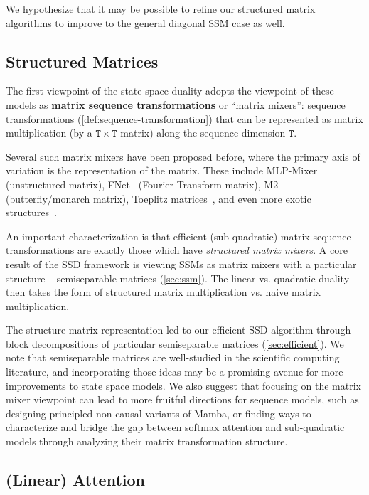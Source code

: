We hypothesize that it may be possible to refine our structured matrix algorithms to improve to the general diagonal SSM case as well.

\subsection{Structured Matrices}
\label{sec:related:matrices}

The first viewpoint of the state space duality adopts the viewpoint of these models as \textbf{matrix sequence transformations} or ``matrix mixers'': sequence transformations (\ref{def:sequence-transformation}) that can be represented as matrix multiplication (by a $\mathtt{T} \times \mathtt{T}$ matrix) along the sequence dimension $\mathtt{T}$.

Several such matrix mixers have been proposed before, where the primary axis of variation is the representation of the matrix. These include MLP-Mixer~\citep{tolstikhin2021mlp} (unstructured matrix), FNet~\citep{lee2021fnet} (Fourier Transform matrix), M2~\citep{dao2019learning,dao2020kaleidoscope,dao2022monarch,fu2024monarch} (butterfly/monarch matrix), Toeplitz matrices~\citep{poli2023hyena,qin2023toeplitz}, and even more exotic structures~\citep{de2018two,thomas2018learning}.

An important characterization is that efficient (sub-quadratic) matrix sequence transformations are exactly those which have \emph{structured matrix mixers}. A core result of the SSD framework is viewing SSMs as matrix mixers with a particular structure -- semiseparable matrices (\ref{sec:ssm}).
The linear vs. quadratic duality then takes the form of structured matrix multiplication vs. naive matrix multiplication.

The structure matrix representation led to our efficient SSD algorithm through block decompositions of particular semiseparable matrices (\ref{sec:efficient}).
We note that semiseparable matrices are well-studied in the scientific computing literature, and incorporating those ideas may be a promising avenue for more improvements to state space models. We also suggest that focusing on the matrix mixer viewpoint can lead to more fruitful directions for sequence models, such as designing principled non-causal variants of Mamba, or finding ways to characterize and bridge the gap between softmax attention and sub-quadratic models through analyzing their matrix transformation structure.

\subsection{(Linear) Attention}
\label{sec:related:attention}

